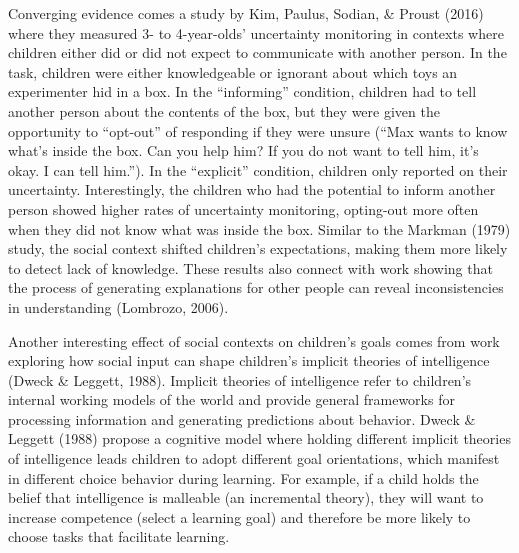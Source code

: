 \documentclass[oneside]{report}
\begin{document}
Converging evidence comes a study by Kim, Paulus, Sodian, \& Proust
(2016) where they measured 3- to 4-year-olds' uncertainty monitoring in
contexts where children either did or did not expect to communicate with
another person. In the task, children were either knowledgeable or
ignorant about which toys an experimenter hid in a box. In the
``informing'' condition, children had to tell another person about the
contents of the box, but they were given the opportunity to ``opt-out''
of responding if they were unsure (``Max wants to know what's inside the
box. Can you help him? If you do not want to tell him, it's okay. I can
tell him.''). In the ``explicit'' condition, children only reported on
their uncertainty. Interestingly, the children who had the potential to
inform another person showed higher rates of uncertainty monitoring,
opting-out more often when they did not know what was inside the box.
Similar to the Markman (1979) study, the social context shifted
children's expectations, making them more likely to detect lack of
knowledge. These results also connect with work showing that the process
of generating explanations for other people can reveal inconsistencies
in understanding (Lombrozo, 2006).

Another interesting effect of social contexts on children's goals comes
from work exploring how social input can shape children's implicit
theories of intelligence (Dweck \& Leggett, 1988). Implicit theories of
intelligence refer to children's internal working models of the world
and provide general frameworks for processing information and generating
predictions about behavior. Dweck \& Leggett (1988) propose a cognitive
model where holding different implicit theories of intelligence leads
children to adopt different goal orientations, which manifest in
different choice behavior during learning. For example, if a child holds
the belief that intelligence is malleable (an incremental theory), they
will want to increase competence (select a learning goal) and therefore
be more likely to choose tasks that facilitate learning.
\end{document}
